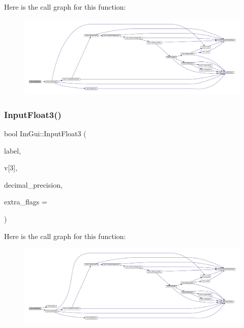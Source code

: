 Here is the call graph for this function\+:
\nopagebreak
\begin{figure}[H]
\begin{center}
\leavevmode
\includegraphics[width=350pt]{namespace_im_gui_a654b614a653848b8fc9a4ad8d1fa4257_cgraph}
\end{center}
\end{figure}
\mbox{\label{namespace_im_gui_acc969c47f54c63f94bee997a51fca39d}} 
\subsubsection{\texorpdfstring{Input\+Float3()}{InputFloat3()}\hspace{0.1cm}{\footnotesize\ttfamily [2/2]}}
{\footnotesize\ttfamily bool Im\+Gui\+::\+Input\+Float3 (\begin{DoxyParamCaption}\item[{const char $\ast$}]{label,  }\item[{float}]{v\mbox{[}3\mbox{]},  }\item[{int}]{decimal\+\_\+precision,  }\item[{\mbox{\hyperlink{imgui_8h_a7d2c6153a6b9b5d3178ce82434ac9fb8}{Im\+Gui\+Input\+Text\+Flags}}}]{extra\+\_\+flags = {} }\end{DoxyParamCaption})}

Here is the call graph for this function\+:
\nopagebreak
\begin{figure}[H]
\begin{center}
\leavevmode
\includegraphics[width=350pt]{namespace_im_gui_acc969c47f54c63f94bee997a51fca39d_cgraph}
\end{center}
\end{figure}
\mbox{\label{namespace_im_gui_a2e45de8550d78834f6c9a0a16db4c38c}} 
